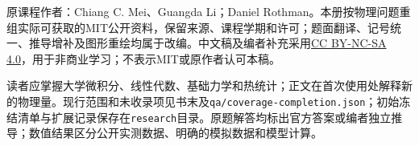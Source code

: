 原课程作者：Chiang C. Mei、Guangda Li；Daniel Rothman。本册按物理问题重组实际可获取的MIT公开资料，保留来源、课程学期和许可；题面翻译、记号统一、推导增补及图形重绘均属于改编。中文稿及编者补充采用\href{https://creativecommons.org/licenses/by-nc-sa/4.0/}{CC BY-NC-SA 4.0}，用于非商业学习；不表示MIT或原作者认可本稿。

读者应掌握大学微积分、线性代数、基础力学和热统计；正文在首次使用处解释新的物理量。现行范围和未收录项见书末及\texttt{qa/coverage-completion.json}；初始冻结清单与扩展记录保存在\texttt{research}目录。原题解答均标出官方答案或编者独立推导；数值结果区分公开实测数据、明确的模拟数据和模型计算。
